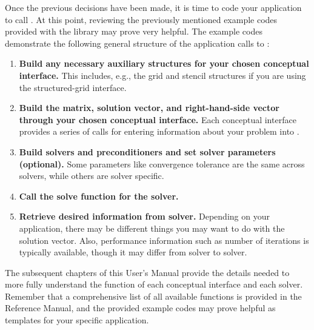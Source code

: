 Once the previous decisions have been made, it is time to code your
application to call \hypre{}.  At this point, reviewing the previously
mentioned example codes provided with the \hypre{} library may prove
very helpful.  The example codes demonstrate the following general structure 
of the application calls to \hypre{}:

\begin{enumerate}

\item
{\bf Build any necessary auxiliary structures for your chosen
conceptual interface.} This includes, e.g., the grid and stencil
structures if you are using the structured-grid interface.

\item
{\bf Build the matrix, solution vector, and right-hand-side vector
through your chosen conceptual interface.}  Each conceptual interface
provides a series of calls for entering information about your problem
into \hypre{}.

\item
{\bf Build solvers and preconditioners and set solver parameters
(optional).}  Some parameters like convergence tolerance are the same
across solvers, while others are solver specific.

\item
{\bf Call the solve function for the solver.}

\item
{\bf Retrieve desired information from solver.} Depending on your
application, there may be different things you may want to do with the
solution vector.  Also, performance information such as number of
iterations is typically available, though it may differ from solver to
solver.

\end{enumerate}

The subsequent chapters of this User's Manual provide the details
needed to more fully understand the function of each conceptual
interface and each solver.  Remember that a comprehensive list of all
available functions is provided in the \hypre{} Reference Manual, and
the provided example codes may prove helpful as templates for your
specific application.




